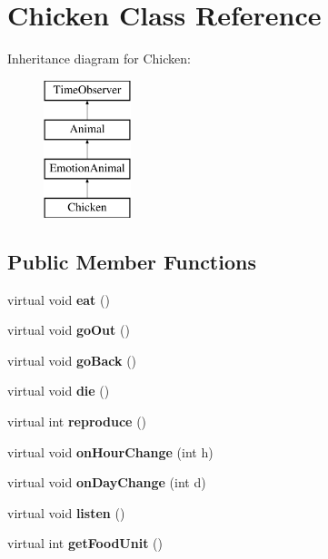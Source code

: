 \hypertarget{class_chicken}{}\section{Chicken Class Reference}
\label{class_chicken}
Inheritance diagram for Chicken\+:\begin{figure}[H]
\begin{center}
\leavevmode
\includegraphics[height=4.000000cm]{class_chicken}
\end{center}
\end{figure}
\subsection*{Public Member Functions}
\begin{DoxyCompactItemize}
\item 
\mbox{\label{class_chicken_aa97cec0b7d3f0e781b201b6e266334f2}} 
virtual void {\bfseries eat} ()
\item 
\mbox{\label{class_chicken_a327d90f77808e083af04dd9c0f7546f2}} 
virtual void {\bfseries go\+Out} ()
\item 
\mbox{\label{class_chicken_a7c8af6c0cb050c3d0ce2ce9809ead79d}} 
virtual void {\bfseries go\+Back} ()
\item 
\mbox{\label{class_chicken_a30db8f1a04f6aa3a4996664e81698f61}} 
virtual void {\bfseries die} ()
\item 
\mbox{\label{class_chicken_ac967d103a38f616fe48743b7c1fa5118}} 
virtual int {\bfseries reproduce} ()
\item 
\mbox{\label{class_chicken_ab27dad98951f0189fc8e83ca517667c4}} 
virtual void {\bfseries on\+Hour\+Change} (int h)
\item 
\mbox{\label{class_chicken_abd9246cbceeba80e73010e421694d3a4}} 
virtual void {\bfseries on\+Day\+Change} (int d)
\item 
\mbox{\label{class_chicken_ab9fccf0929444a4b96baf20fc783a979}} 
virtual void {\bfseries listen} ()
\item 
\mbox{\label{class_chicken_afba7dbf13389291d6ee634b8e020acdd}} 
virtual int {\bfseries get\+Food\+Unit} ()
\end{DoxyCompactItemize}
